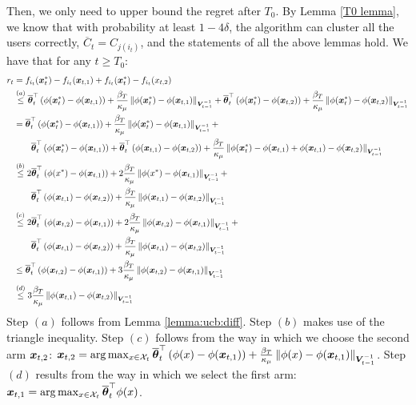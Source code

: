 Then, we only need to upper bound the regret after $T_0$. By Lemma \ref{T0 lemma}, we know that with probability at least $1-4\delta$, the algorithm can cluster all the users correctly, $\overline{C}_t=C_{j(i_t)}$, and the statements of all the above lemmas hold. We have that for any $t\geq T_0$:
\begin{equation}
\begin{split}
r_t &= f_{i_t}(\boldsymbol{x}^*_t) - f_{i_t}(\boldsymbol{x}_{t,1}) + f_{i_t}(\boldsymbol{x}^*_t) - f_{i_t}(x_{t,2})\\
&\stackrel{(a)}{\leq} \overline{\boldsymbol{\theta}}_t^\top \left( \phi(\boldsymbol{x}^*_t) - \phi(\boldsymbol{x}_{t,1}) \right) + \frac{\beta_T}{\kappa_\mu}\left\| \phi(\boldsymbol{x}^*_t) - \phi(\boldsymbol{x}_{t,1}) \right\|_{\boldsymbol{V}_{t-1}^{-1}} +  \overline{\boldsymbol{\theta}}_t^\top \left( \phi(\boldsymbol{x}^*_t) - \phi(\boldsymbol{x}_{t,2}) \right) + \frac{\beta_T}{\kappa_\mu}\left\| \phi(\boldsymbol{x}^*_t) - \phi(\boldsymbol{x}_{t,2}) \right\|_{\boldsymbol{V}_{t-1}^{-1}}\\
&= \overline{\boldsymbol{\theta}}_t^\top \left( \phi(\boldsymbol{x}^*_t) - \phi(\boldsymbol{x}_{t,1}) \right) + \frac{\beta_T}{\kappa_\mu}\left\| \phi(\boldsymbol{x}^*_t) - \phi(\boldsymbol{x}_{t,1}) \right\|_{\boldsymbol{V}_{t-1}^{-1}} + \\
&\qquad \overline{\boldsymbol{\theta}}_t^\top \left( \phi(\boldsymbol{x}^*_t) - \phi(\boldsymbol{x}_{t,1}) \right) + \overline{\boldsymbol{\theta}}_t^\top \left( \phi(\boldsymbol{x}_{t,1}) - \phi(\boldsymbol{x}_{t,2}) \right) + \frac{\beta_T}{\kappa_\mu}\left\| \phi(\boldsymbol{x}^*_t) - \phi(\boldsymbol{x}_{t,1}) + \phi(\boldsymbol{x}_{t,1}) - \phi(\boldsymbol{x}_{t,2}) \right\|_{\boldsymbol{V}_{t-1}^{-1}}\\
&\stackrel{(b)}{\leq} 2 \overline{\boldsymbol{\theta}}_t^\top \left( \phi(x^*) - \phi(\boldsymbol{x}_{t,1}) \right) + 2 \frac{\beta_T}{\kappa_\mu}\left\| \phi(x^*) - \phi(\boldsymbol{x}_{t,1}) \right\|_{\boldsymbol{V}_{t-1}^{-1}} + \\
&\qquad \overline{\boldsymbol{\theta}}_t^\top \left( \phi(\boldsymbol{x}_{t,1}) - \phi(\boldsymbol{x}_{t,2}) \right) + \frac{\beta_T}{\kappa_\mu}\left\| \phi(\boldsymbol{x}_{t,1}) - \phi(\boldsymbol{x}_{t,2}) \right\|_{\boldsymbol{V}_{t-1}^{-1}}\\
&\stackrel{(c)}{\leq} 2 \overline{\boldsymbol{\theta}}_t^\top \left( \phi(\boldsymbol{x}_{t,2}) - \phi(\boldsymbol{x}_{t,1}) \right) + 2 \frac{\beta_T}{\kappa_\mu}\left\| \phi(\boldsymbol{x}_{t,2}) - \phi(\boldsymbol{x}_{t,1}) \right\|_{\boldsymbol{V}_{t-1}^{-1}} + \\
&\qquad \overline{\boldsymbol{\theta}}_t^\top \left( \phi(\boldsymbol{x}_{t,1}) - \phi(\boldsymbol{x}_{t,2}) \right) + \frac{\beta_T}{\kappa_\mu}\left\| \phi(\boldsymbol{x}_{t,1}) - \phi(\boldsymbol{x}_{t,2}) \right\|_{\boldsymbol{V}_{t-1}^{-1}}\\
&\leq \overline{\boldsymbol{\theta}}_t^\top \left( \phi(\boldsymbol{x}_{t,2}) - \phi(\boldsymbol{x}_{t,1}) \right) + 3 \frac{\beta_T}{\kappa_\mu}\left\| \phi(\boldsymbol{x}_{t,2}) - \phi(\boldsymbol{x}_{t,1}) \right\|_{\boldsymbol{V}_{t-1}^{-1}} \\
&\stackrel{(d)}{\leq} 3 \frac{\beta_T}{\kappa_\mu}\left\| \phi(\boldsymbol{x}_{t,1}) - \phi(\boldsymbol{x}_{t,2}) \right\|_{\boldsymbol{V}_{t-1}^{-1}} \\
\end{split}
\label{eq:upper:bound:inst:regret}
\end{equation}
Step $(a)$ follows from Lemma \ref{lemma:ucb:diff}. Step $(b)$ makes use of the triangle inequality.
Step $(c)$ follows from the way in which we choose the second arm $\boldsymbol{x}_{t,2}$: $\boldsymbol{x}_{t,2} = \arg\max_{x\in\mathcal{X}_t} \overline{\boldsymbol{\theta}}_t^\top \left( \phi(x) - \phi(\boldsymbol{x}_{t,1}) \right) + \frac{\beta_T}{\kappa_\mu}\left\| \phi(x) - \phi(\boldsymbol{x}_{t,1}) \right\|_{\boldsymbol{V}_{t-1}^{-1}}$.
Step $(d)$ results from the way in which we select the first arm: $\boldsymbol{x}_{t,1} = \arg\max_{x\in\mathcal{X}_t}\overline{\boldsymbol{\theta}}_t^\top \phi(x)$.

